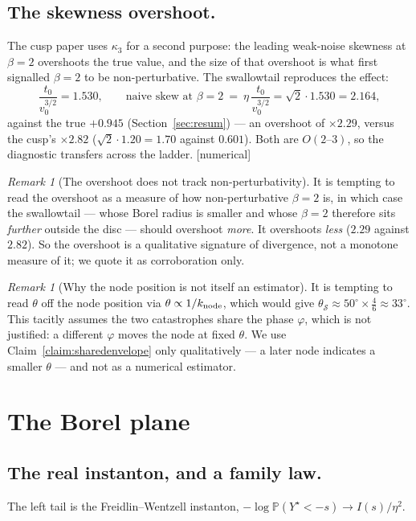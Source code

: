\documentclass[11pt,reqno]{amsart}
\theoremstyle{plain}
\theoremstyle{definition}
\theoremstyle{remark}
\newtheorem{remark}[theorem]{Remark}
\newcommand{\Prob}{\mathbb{P}}
\newcommand{\Sw}{\mathcal{S}}
\newcommand{\tagN}{{\footnotesize\textsf{[numerical]}}}
\begin{document}
\subsection{The skewness overshoot.}
The cusp paper uses $\kappa_3$ for a second purpose: the leading weak-noise skewness at $\beta=2$
overshoots the true value, and the size of that overshoot is what first signalled $\beta=2$ to be
non-perturbative. The swallowtail reproduces the effect:
\begin{equation}\label{eq:overshoot}
\frac{t_0}{v_0^{3/2}}=1.530,\qquad
\text{naive skew at }\beta{=}2\ =\ \eta\,\frac{t_0}{v_0^{3/2}}=\sqrt2\cdot1.530=2.164,
\end{equation}
against the true $+0.945$ (Section~\ref{sec:resum}) --- an overshoot of $\times2.29$, versus the
cusp's $\times2.82$ ($\sqrt2\cdot1.20=1.70$ against $0.601$). Both are $O(2\text{--}3)$, so the
diagnostic transfers across the ladder. \tagN

\begin{remark}[The overshoot does not track non-perturbativity]\label{rem:overshootcaveat}
It is tempting to read the overshoot as a measure of how non-perturbative $\beta=2$ is, in which
case the swallowtail --- whose Borel radius is smaller and whose $\beta=2$ therefore sits
\emph{further} outside the disc --- should overshoot \emph{more}. It overshoots \emph{less}
($2.29$ against $2.82$). So the overshoot is a qualitative signature of divergence, not a
monotone measure of it; we quote it as corroboration only.
\end{remark}

\begin{remark}[Why the node position is not itself an estimator]\label{rem:nodecaveat}
It is tempting to read $\theta$ off the node position via $\theta\propto1/k_{\rm node}$, which would
give $\theta_{\Sw}\approx50^\circ\times\tfrac46\approx33^\circ$. This tacitly assumes the two
catastrophes share the phase $\varphi$, which is not justified: a different $\varphi$ moves the node
at fixed $\theta$. We use Claim~\ref{claim:sharedenvelope} only qualitatively --- a later node
indicates a smaller $\theta$ --- and not as a numerical estimator.
\end{remark}

\section{The Borel plane}\label{sec:borel}

\subsection{The real instanton, and a family law.}
The left tail is the Freidlin--Wentzell instanton, $-\log\Prob(Y^\star<-s)\to I(s)/\eta^2$.
\end{document}
